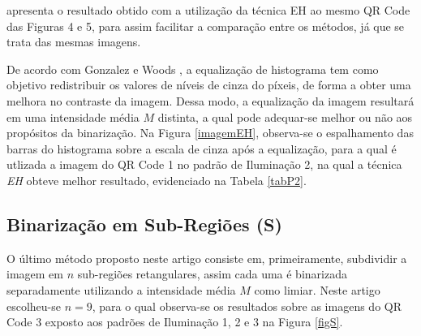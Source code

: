 \documentclass{ceel}
\begin{document}
\begin{multicols}{2}
\begin{minipage}[h]{\columnwidth}
 \hfill 
{}
\vspace{-0.1cm}
\caption{Imagens resultantes da Binarização com Limiar Fixo para o QR Code 3 nos padrões de (a) Iluminação 1, (c) Iluminação 2 e (e) Iluminação 3, com suas respectivas imagens diferença em (b), (d) e (f).} \label{figLF}
\end{minipage}

\vspace{0.4cm}
\noindent apresenta o resultado obtido com a utilização da técnica EH ao mesmo QR Code das Figuras 4 e 5, para assim facilitar a comparação entre os métodos, já que se trata das mesmas imagens.

De acordo com Gonzalez e Woods \cite{gonzales}, a equalização de histograma tem como objetivo redistribuir os valores de níveis de cinza do píxeis, de forma a obter uma melhora no contraste da imagem. Dessa modo, a equalização da imagem resultará em uma intensidade média $M$ distinta, a qual pode adequar-se melhor ou não aos propósitos da binarização. Na Figura \ref{imagemEH}, observa-se o espalhamento das barras do histograma sobre a escala de cinza após a equalização, para a qual é utlizada a imagem do QR Code 1 no padrão de Iluminação 2, na qual a técnica \emph{EH} obteve melhor resultado, evidenciado na Tabela \ref{tabP2}.

\subsection{Binarização em Sub-Regiões (S)} \label{Cdiv} 
O último método proposto neste artigo consiste em, primeiramente, subdividir a imagem em $n$ sub-regiões retangulares, assim cada uma é binarizada separadamente utilizando a intensidade média $M$ como limiar.
Neste artigo escolheu-se $n=9$, para o qual observa-se os resultados sobre as imagens do QR Code 3 exposto aos padrões de Iluminação 1, 2 e 3 na Figura \ref{figS}. 



\end{multicols}
\end{document}
